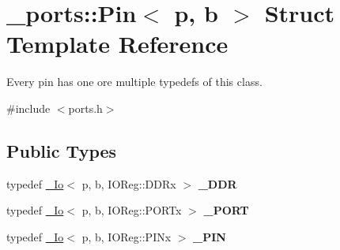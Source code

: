 \hypertarget{struct__ports_1_1Pin}{}\section{\+\_\+ports\+:\+:Pin$<$ p, b $>$ Struct Template Reference}
\label{struct__ports_1_1Pin}


Every pin has one ore multiple typedefs of this class.  




{\ttfamily \#include $<$ports.\+h$>$}

\subsection*{Public Types}
\begin{DoxyCompactItemize}
\item 
typedef \hyperlink{struct__ports_1_1__Io}{\+\_\+\+Io}$<$ p, b, I\+O\+Reg\+::\+D\+D\+Rx $>$ {\bfseries \+\_\+\+D\+DR}\hypertarget{struct__ports_1_1Pin_a694178f8ce18ef6d4cc765486ee4d531}{}\label{struct__ports_1_1Pin_a694178f8ce18ef6d4cc765486ee4d531}

\item 
typedef \hyperlink{struct__ports_1_1__Io}{\+\_\+\+Io}$<$ p, b, I\+O\+Reg\+::\+P\+O\+R\+Tx $>$ {\bfseries \+\_\+\+P\+O\+RT}\hypertarget{struct__ports_1_1Pin_a11c1eb4fa8c7d2c8087e52327a09e8ce}{}\label{struct__ports_1_1Pin_a11c1eb4fa8c7d2c8087e52327a09e8ce}

\item 
typedef \hyperlink{struct__ports_1_1__Io}{\+\_\+\+Io}$<$ p, b, I\+O\+Reg\+::\+P\+I\+Nx $>$ {\bfseries \+\_\+\+P\+IN}\hypertarget{struct__ports_1_1Pin_aab4675572a8e1b73e788bb9e60e98f60}{}\label{struct__ports_1_1Pin_aab4675572a8e1b73e788bb9e60e98f60}

\end{DoxyCompactItemize}
